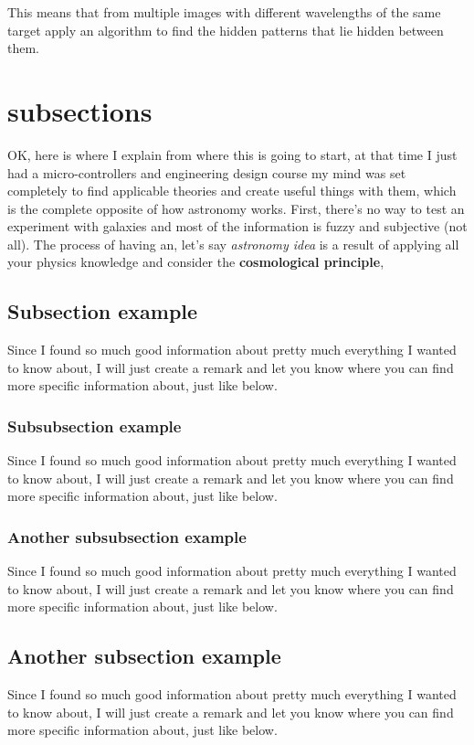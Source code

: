 This means that from multiple images with different wavelengths of the same target apply an algorithm to find the hidden patterns that lie hidden between them.

\section{subsections}
OK, here is where I explain from where this is going to start, at that time I just had a micro-controllers and engineering design course my mind was set completely to find applicable theories and create useful things with them, which is the complete opposite of how astronomy works. First, there's no way to test an experiment with galaxies and most of the information is fuzzy and subjective (not all). The process of having an, let's say \emph{astronomy idea} is a result of applying all your physics knowledge and consider the \textbf{cosmological principle},

\subsection{Subsection example}
Since I found so much good information about pretty much everything I wanted to know about, I will just create a remark and let you know where you can find more specific information about, just like below.

\subsubsection{Subsubsection example}
Since I found so much good information about pretty much everything I wanted to know about, I will just create a remark and let you know where you can find more specific information about, just like below.

\subsubsection{Another subsubsection example}
Since I found so much good information about pretty much everything I wanted to know about, I will just create a remark and let you know where you can find more specific information about, just like below.

\subsection{Another subsection example}
Since I found so much good information about pretty much everything I wanted to know about, I will just create a remark and let you know where you can find more specific information about, just like below.

